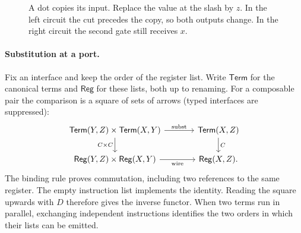 \documentclass[11pt,a4paper]{article}
\theoremstyle{definition}
\theoremstyle{remark}\newaliascnt{remark}{theorem}
\numberwithin{equation}{section}
\begin{document}
\begin{figure}[!htbp]
    \centering\small
    \caption{A dot copies its input. Replace the value at the slash by $z$. In the left circuit the cut precedes the copy, so both outputs change. In the right circuit the second gate still receives $x$.}
    \label{fig:shared-gate-cut}
\end{figure}


\paragraph{Substitution at a port.}
Fix an interface and keep the order of the register list. Write \(\mathsf{Term}\) for the canonical terms and \(\mathsf{Reg}\) for these lists, both up to renaming. For a composable pair the comparison is a square of sets of arrows (typed interfaces are suppressed):
\[
\begin{tikzcd}[column sep=large]
 \mathsf{Term}(Y,Z)\times\mathsf{Term}(X,Y)\arrow[r,"\mathrm{subst}"]\arrow[d,"C\times C"']&
 \mathsf{Term}(X,Z)\arrow[d,"C"]\\
 \mathsf{Reg}(Y,Z)\times\mathsf{Reg}(X,Y)\arrow[r,"\mathrm{wire}"']&
 \mathsf{Reg}(X,Z).
\end{tikzcd}
\]
The binding rule proves commutation, including two references to the same register. The empty instruction list implements the identity. Reading the square upwards with \(D\) therefore gives the inverse functor. When two terms run in parallel, exchanging independent instructions identifies the two orders in which their lists can be emitted.
\end{document}
